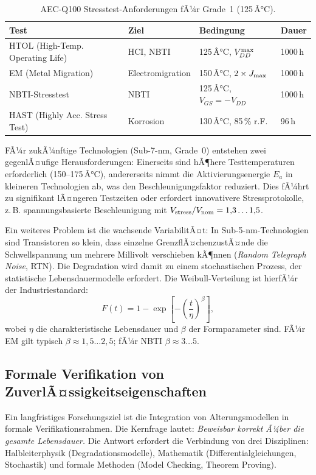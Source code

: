 ﻿\documentclass[a4paper,12pt]{article}
\theoremstyle{definition}
\begin{document}
\begin{table}[htbp]
	\centering
	\caption{AEC-Q100 Stresstest-Anforderungen fÃ¼r Grade~1 (125\,Â°C).}
	\label{tab:aecq100}
	\begin{tabular}{@{}llll@{}}
		\toprule
		Test & Ziel & Bedingung & Dauer \\
		\midrule
		HTOL (High-Temp. Operating Life) & HCI, NBTI & 125\,Â°C, $V_{DD}^{\rm max}$ & 1000\,h \\
		EM (Metal Migration) & Electromigration & 150\,Â°C, $2\times J_{\rm max}$ & 1000\,h \\
		NBTI-Stresstest & NBTI & 125\,Â°C, $V_{GS} = -V_{DD}$ & 1000\,h \\
		HAST (Highly Acc. Stress Test) & Korrosion & 130\,Â°C, 85\,\% r.F. & 96\,h \\
		\bottomrule
	\end{tabular}
\end{table}

FÃ¼r zukÃ¼nftige Technologien (Sub-7-nm, Grade~0) entstehen zwei gegenlÃ¤ufige
Herausforderungen: Einerseits sind hÃ¶here Testtemperaturen erforderlich
(150--175\,Â°C), andererseits nimmt die Aktivierungsenergie $E_a$ in
kleineren Technologien ab, was den Beschleunigungsfaktor reduziert. Dies
fÃ¼hrt zu signifikant lÃ¤ngeren Testzeiten oder erfordert innovativere
Stressprotokolle, z.\,B. spannungsbasierte Beschleunigung mit
$V_{\rm stress} / V_{\rm nom} = 1{,}3\ldots 1{,}5$.

Ein weiteres Problem ist die wachsende VariabilitÃ¤t: In Sub-5-nm-Technologien
sind Transistoren so klein, dass einzelne GrenzflÃ¤chenzustÃ¤nde die
Schwellspannung um mehrere Millivolt verschieben kÃ¶nnen (\emph{Random
Telegraph Noise}, RTN). Die Degradation wird damit zu einem stochastischen
Prozess, der statistische Lebensdauermodelle erfordert. Die Weibull-Verteilung
ist hierfÃ¼r der Industriestandard:
\[
F(t) = 1 - \exp\!\left[-\left(\frac{t}{\eta}\right)^\beta\right],
\]
wobei $\eta$ die charakteristische Lebensdauer und $\beta$ der Formparameter sind.
FÃ¼r EM gilt typisch $\beta \approx 1{,}5\ldots 2{,}5$; fÃ¼r NBTI $\beta \approx 3\ldots 5$.

\subsection{Formale Verifikation von ZuverlÃ¤ssigkeitseigenschaften}
\label{sub:formal}

Ein langfristiges Forschungsziel ist die Integration von Alterungsmodellen in
formale Verifikationsrahmen. Die Kernfrage lautet: \emph{Beweisbar korrekt Ã¼ber
die gesamte Lebensdauer.} Die Antwort erfordert die Verbindung von drei Disziplinen:
Halbleiterphysik (Degradationsmodelle), Mathematik (Differentialgleichungen,
Stochastik) und formale Methoden (Model Checking, Theorem Proving).
\end{document}
